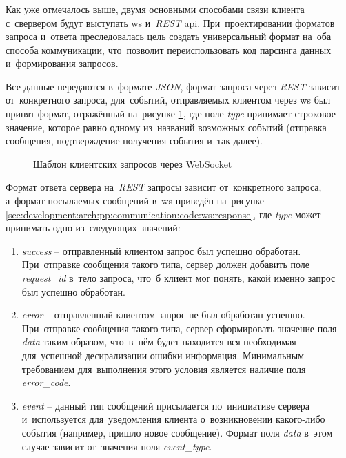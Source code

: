 \subsubsection{}
\label{sec:development:arch:pp:communication}

Как уже отмечалось выше, двумя основными способами связи клиента с~свервером будут выступать \gls{ws} и~\textit{REST} \gls{api}. При~проектировании форматов запроса и~ответа преследовалась цель создать универсальный формат на~оба способа коммуникации, что~позволит переиспользовать код парсинга данных и~формирования запросов.

Все данные передаются в~формате \textit{JSON}, формат запроса через \textit{REST} зависит от~конкретного запроса, для~событий, отправляемых клиентом через \gls{ws} был принят формат, отражённый на~рисунке \ref{sec:development:arch:pp:communication:code:ws:request}, где поле \textit{type} принимает строковое значение, которое равно одному из~названий возможных событий (отправка сообщения, подтверждение получения события и~так далее).

\begin{figure}[h]
	
   \caption{Шаблон клиентских запросов через WebSocket}
   \label{sec:development:arch:pp:communication:code:ws:request}
\end{figure}

Формат ответа сервера на~\textit{REST} запросы зависит от~конкретного запроса, а~формат посылаемых сообщений в~\gls{ws} приведён на~рисунке \ref{sec:development:arch:pp:communication:code:ws:response}, где \textit{type} может принимать одно из~следующих значений: 

\begin{enumerate}
	\item \textit{success} -- отправленный клиентом запрос был успешно обработан. При~отправке сообщения такого типа, сервер должен добавить поле \textit{request\_id} в~тело запроса, что~б клиент мог понять, какой именно запрос был успешно обработан.
	\item \textit{error} -- отправленный клиентом запрос не был обработан успешно. При~отправке сообщения такого типа, сервер сформировать значение поля \textit{data} таким образом, что~в~нём будет находится вся необходимая для~успешной десирализации ошибки информация. Минимальным требованием для~выполнения этого условия является наличие поля \textit{error\_code}.
	\item \textit{event} -- данный тип сообщений присылается по~инициативе сервера и~используется для~уведомления клиента о~возникновении какого-либо события (например, пришло новое сообщение). Формат поля \textit{data} в~этом случае зависит от~значения поля \textit{event\_type}.
\end{enumerate}

